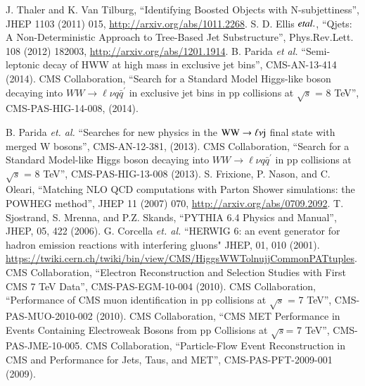 \begin{thebibliography}{99}
 J. Thaler and K. Van Tilburg, ``Identifying Boosted Objects with N-subjettiness'', JHEP 1103 (2011) 015, {\url{http://arxiv.org/abs/1011.2268}}.
 S. D. Ellis $\it et al.$, ``Qjets: A Non-Deterministic Approach to Tree-Based Jet Substructure'', Phys.Rev.Lett. 108 (2012) 182003, \url{http://arxiv.org/abs/1201.1914}.
 B. Parida {\it et al.} ``Semi-leptonic decay of HWW at high mass in exclusive jet bins'', CMS-AN-13-414 (2014).
 CMS Collaboration, ``Search for a Standard Model Higgs-like boson decaying into $WW\rightarrow \ell\nu q\bar q^{\prime}$ in exclusive jet bins in pp collisions at $\sqrt {s}$ = 8 TeV'', CMS-PAS-HIG-14-008, (2014).

 B. Parida {\it et. al.} ``Searches for new physics in the $\rm WW\rightarrow \ell\nu j$ final state with merged W bosons'', CMS-AN-12-381, (2013).
 CMS Collaboration, ``Search for a Standard Model-like Higgs boson decaying into $WW\rightarrow \ell \nu q\bar q^{\prime}$ in pp collisions at $\sqrt {s}$ = 8 TeV'', CMS-PAS-HIG-13-008 (2013).
 S. Frixione, P. Nason, and C. Oleari, ``Matching NLO QCD computations with Parton
Shower simulations: the POWHEG method'', JHEP 11 (2007) 070, \url{http://arxiv.org/abs/0709.2092}.
 T. Sjostrand, S. Mrenna, and P.Z. Skands, ``PYTHIA 6.4 Physics and Manual'', JHEP, 05, 422 (2006).
 G. Corcella {\it et. al.} ``HERWIG 6: an event generator for hadron emission reactions with interfering gluons" JHEP, 01, 010 (2001). 
  {\url {https://twiki.cern.ch/twiki/bin/view/CMS/HiggsWWTolnujjCommonPATtuples}}.
 CMS Collaboration, ``Electron Reconstruction and Selection Studies with First CMS 7
TeV Data'', CMS-PAS-EGM-10-004 (2010).
 CMS Collaboration, ``Performance of CMS muon identification in pp collisions at $\sqrt {s}$ = 7 TeV'', CMS-PAS-MUO-2010-002 (2010).
 CMS Collaboration, ``CMS MET Performance in Events Containing Electroweak Bosons from pp Collisions at $\sqrt s$= 7 TeV'', CMS-PAS-JME-10-005.
 CMS Collaboration, ``Particle-Flow Event Reconstruction in CMS and Performance for Jets, Taus, and MET'', CMS-PAS-PFT-2009-001 (2009).


\end{thebibliography}
